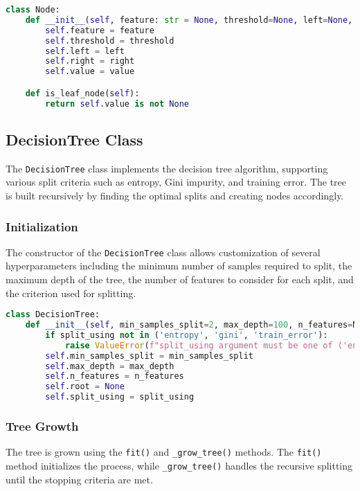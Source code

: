 \documentclass{article}
\begin{document}
\begin{lstlisting}[language=Python, caption=Node Class]
class Node:
    def __init__(self, feature: str = None, threshold=None, left=None, right=None, *, value=None):
        self.feature = feature
        self.threshold = threshold
        self.left = left
        self.right = right
        self.value = value

    def is_leaf_node(self):
        return self.value is not None
\end{lstlisting}

\subsection{DecisionTree Class}
The \texttt{DecisionTree} class implements the decision tree algorithm, supporting various split criteria such as entropy, Gini impurity, and training error. The tree is built recursively by finding the optimal splits and creating nodes accordingly.

\subsubsection{Initialization}
The constructor of the \texttt{DecisionTree} class allows customization of several hyperparameters including the minimum number of samples required to split, the maximum depth of the tree, the number of features to consider for each split, and the criterion used for splitting.

\begin{lstlisting}[language=Python, caption=DecisionTree Class Initialization]
class DecisionTree:
    def __init__(self, min_samples_split=2, max_depth=100, n_features=None, split_using="entropy"):
        if split_using not in ('entropy', 'gini', 'train_error'):
            raise ValueError(f"split_using argument must be one of ('entropy', 'gini', 'train_error')")
        self.min_samples_split = min_samples_split
        self.max_depth = max_depth
        self.n_features = n_features
        self.root = None
        self.split_using = split_using
\end{lstlisting}

\subsubsection{Tree Growth}
The tree is grown using the \texttt{fit()} and \texttt{\_grow_tree()} methods. The \texttt{fit()} method initializes the process, while \texttt{\_grow_tree()} handles the recursive splitting until the stopping criteria are met.
\end{document}
